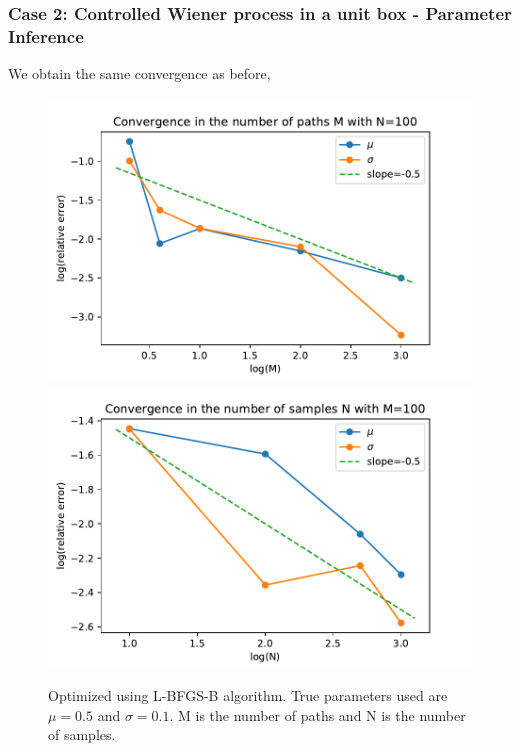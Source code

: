 \documentclass[aspectratio=169]{beamer}\usepackage[utf8]{inputenc}
\begin{document}
{\begin{frame}
\end{frame}


\begin{frame}\frametitle{Case 2: Controlled Wiener process in a unit box - Parameter Inference }

We obtain the same convergence as before,

\begin{figure}
  \includegraphics[scale=0.5]{Figures/conv_M_box.pdf}
   \includegraphics[scale=0.5]{Figures/conv_N_box.pdf}
  \caption{Optimized using L-BFGS-B algorithm. True parameters used are $\mu = 0.5$ and $\sigma = 0.1$. M is the number of paths and N is the number of samples.   }
\end{figure}

\end{frame}


}
\end{document}
